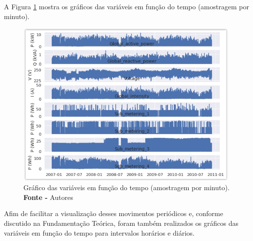 A Figura \ref{fig: Gráfico das variáveis em função do tempo (amostragem por minuto)} mostra os gráficos das variáveis em função do tempo (amostragem por minuto).
\begin{figure}[H]
    \centering
    \includegraphics[width=0.99\textwidth]{Figuras/4. Resultados e Discussões/Exer4/Gráfico das variáveis em função do tempo (amostragem por minuto).jpg}
    \caption{Gráfico das variáveis em função do tempo (amostragem por minuto).\\ \textbf{Fonte -} Autores}
    \label{fig: Gráfico das variáveis em função do tempo (amostragem por minuto)}
\end{figure}

Afim de facilitar a visualização desses movimentos periódicos e, conforme discutido na Fundamentação Teórica, foram também realizados os gráficos das variáveis em função do tempo para intervalos horários e diários.

